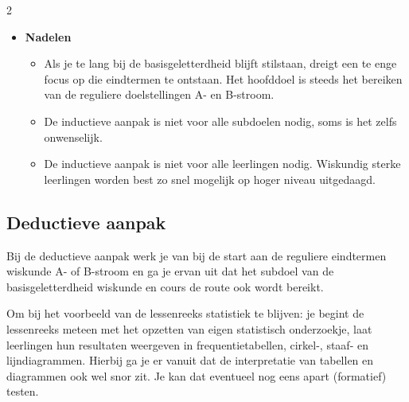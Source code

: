 \begin{multicols}{2}
\begin{itemize}
\begin{itemize}
    \end{itemize}
    \item \textbf{Nadelen}
    \begin{itemize}
        \item Als je te lang bij de basisgeletterdheid blijft stilstaan, dreigt een te enge focus op die eindtermen te ontstaan. Het hoofddoel is steeds het bereiken van de reguliere doelstellingen A- en B-stroom.
        \item De inductieve aanpak is niet voor alle subdoelen nodig, soms is het zelfs onwenselijk.
        \item De inductieve aanpak is niet voor alle leerlingen nodig. Wiskundig sterke leerlingen worden best zo snel mogelijk op hoger niveau uitgedaagd.
    \end{itemize}
\end{itemize}
\subsection{Deductieve aanpak}

Bij de deductieve aanpak werk je van bij de start aan de reguliere eindtermen wiskunde A- of B-stroom en ga je ervan uit dat het subdoel van de basisgeletterdheid wiskunde en cours de route ook wordt bereikt. 


Om bij het voorbeeld van de lessenreeks statistiek te blijven: je begint de lessenreeks meteen met het opzetten van eigen statistisch onderzoekje, laat leerlingen hun resultaten weergeven in frequentietabellen, cirkel-, staaf- en lijndiagrammen. Hierbij ga je er vanuit dat de interpretatie van tabellen en diagrammen ook wel snor zit. Je kan dat eventueel nog eens apart (formatief) testen. 


\end{multicols}
